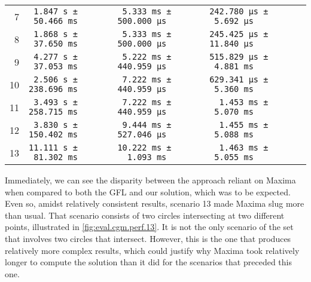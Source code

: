\begin{table}[htb]
\begin{tabular*}{\linewidth}{r*{3}{l}l}
     7 & \texttt{~1.847 s ± ~50.466 ms}
       & \texttt{~5.333 ms ± 500.000 μs}
       & \texttt{242.780 μs ± ~5.692 μs} &\\
     8 & \texttt{~1.868 s ± ~37.650 ms}
       & \texttt{~5.333 ms ± 500.000 μs}
       & \texttt{245.425 μs ± 11.840 μs} &\\
     9 & \texttt{~4.277 s ± ~37.053 ms}
       & \texttt{~5.222 ms ± 440.959 μs}
       & \texttt{515.829 μs ± ~4.881 ms} &\\
    10 & \texttt{~2.506 s ± 238.696 ms}
       & \texttt{~7.222 ms ± 440.959 μs}
       & \texttt{629.341 μs ± ~5.360 ms} &\\
    11 & \texttt{~3.493 s ± 258.715 ms}
       & \texttt{~7.222 ms ± 440.959 μs}
       & \texttt{~~1.453 ms ± ~5.070 ms} &\\
    12 & \texttt{~3.830 s ± 150.402 ms}
       & \texttt{~9.444 ms ± 527.046 μs}
       & \texttt{~~1.455 ms ± ~5.088 ms} &\\
    13 & \texttt{11.111 s ± ~81.302 ms}
       & \texttt{10.222 ms ± ~~1.093 ms}
       & \texttt{~~1.463 ms ± ~5.055 ms} &\\
    \bottomrule
  \end{tabular*}
\end{table}

Immediately, we can see the disparity between the approach reliant on Maxima
when compared to both the \ac{GFL} and our solution, which was to be expected.
Even so, amidst relatively consistent results, scenario 13 made Maxima slug more
than usual.  That scenario consists of two circles intersecting at two different
points, illustrated in \cref{fig:eval.cgm.perf.13}.  It is not the only scenario
of the set that involves two circles that intersect.  However, this is the one
that produces relatively more complex results, which could justify why Maxima
took relatively longer to compute the solution than it did for the scenarios
that preceded this one.

